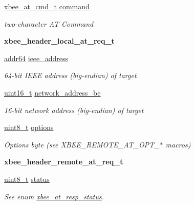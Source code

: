 \begin{DoxyCompactItemize}
\hyperlink{unionxbee__at__cmd__t}{xbee\+\_\+at\+\_\+cmd\+\_\+t} \hyperlink{group__xbee__atcmd_ga1a5aaa930940857f68f245eeb89506b5}{command}
\begin{DoxyCompactList}\small\item\em two-\/character AT Command \end{DoxyCompactList}\item 
\mbox{\label{group__xbee__atcmd_ga568e56506b6d03a08723e768edbbcfa7}} 
{\bfseries xbee\+\_\+header\+\_\+local\+\_\+at\+\_\+req\+\_\+t}
\item 
\hyperlink{unionaddr64}{addr64} \hyperlink{group__xbee__atcmd_ga2549f921e25a72dfa05a2154a792e2bf}{ieee\+\_\+address}
\begin{DoxyCompactList}\small\item\em 64-\/bit I\+E\+EE address (big-\/endian) of target \end{DoxyCompactList}\item 
\hyperlink{group__hal__dos_ga5a8b2dc9e45a9ee81a94ef304fb62505}{uint16\+\_\+t} \hyperlink{group__xbee__atcmd_ga73d48563eb05cd5fcc4add79d226a3b8}{network\+\_\+address\+\_\+be}
\begin{DoxyCompactList}\small\item\em 16-\/bit network address (big-\/endian) of target \end{DoxyCompactList}\item 
\hyperlink{group__hal__dos_gae1affc9ca37cfb624959c866a73f83c2}{uint8\+\_\+t} \hyperlink{group__xbee__atcmd_gaace3d640c8d449b8db1162993d259d3f}{options}
\begin{DoxyCompactList}\small\item\em Options byte (see X\+B\+E\+E\+\_\+\+R\+E\+M\+O\+T\+E\+\_\+\+A\+T\+\_\+\+O\+P\+T\+\_\+$\ast$ macros) \end{DoxyCompactList}\item 
\mbox{\label{group__xbee__atcmd_gac183f43dbcf4b089132cd4c5f1677d62}} 
{\bfseries xbee\+\_\+header\+\_\+remote\+\_\+at\+\_\+req\+\_\+t}
\item 
\hyperlink{group__hal__dos_gae1affc9ca37cfb624959c866a73f83c2}{uint8\+\_\+t} \hyperlink{group__xbee__atcmd_gade818037fd6c985038ff29656089758d}{status}
\begin{DoxyCompactList}\small\item\em See enum \hyperlink{group__xbee__atcmd_gac6a27f1b1ee32b75b6f966afbb347f22}{xbee\+\_\+at\+\_\+resp\+\_\+status}. \end{DoxyCompactList}\item 

\end{DoxyCompactItemize}
